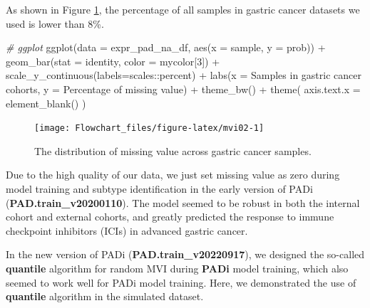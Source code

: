 \documentclass[
  12pt,
]{book}
\newenvironment{Shaded}{\begin{snugshade}}{\end{snugshade}}
\newcommand{\AttributeTok}[1]{\textcolor[rgb]{0.77,0.63,0.00}{#1}}
\newcommand{\CommentTok}[1]{\textcolor[rgb]{0.56,0.35,0.01}{\textit{#1}}}
\newcommand{\DecValTok}[1]{\textcolor[rgb]{0.00,0.00,0.81}{#1}}
\newcommand{\FunctionTok}[1]{\textcolor[rgb]{0.00,0.00,0.00}{#1}}
\newcommand{\NormalTok}[1]{#1}
\newcommand{\SpecialCharTok}[1]{\textcolor[rgb]{0.00,0.00,0.00}{#1}}
\newcommand{\StringTok}[1]{\textcolor[rgb]{0.31,0.60,0.02}{#1}}
\begin{document}
As shown in Figure \ref{fig:mvi02}, the percentage of all samples in gastric cancer datasets we used is lower than 8\%.

\begin{Shaded}
\begin{Highlighting}[]
\CommentTok{\# ggplot}
\FunctionTok{ggplot}\NormalTok{(}\AttributeTok{data =}\NormalTok{ expr\_pad\_na\_df, }
       \FunctionTok{aes}\NormalTok{(}\AttributeTok{x =}\NormalTok{ sample, }\AttributeTok{y =}\NormalTok{ prob)) }\SpecialCharTok{+} 
  \FunctionTok{geom\_bar}\NormalTok{(}\AttributeTok{stat =} \StringTok{\textquotesingle{}identity\textquotesingle{}}\NormalTok{, }\AttributeTok{color =}\NormalTok{ mycolor[}\DecValTok{3}\NormalTok{]) }\SpecialCharTok{+} 
  \FunctionTok{scale\_y\_continuous}\NormalTok{(}\AttributeTok{labels=}\NormalTok{scales}\SpecialCharTok{::}\NormalTok{percent) }\SpecialCharTok{+} 
  \FunctionTok{labs}\NormalTok{(}\AttributeTok{x =} \StringTok{\textquotesingle{}Samples in gastric cancer cohorts\textquotesingle{}}\NormalTok{, }
       \AttributeTok{y =} \StringTok{\textquotesingle{}Percentage of missing value\textquotesingle{}}\NormalTok{) }\SpecialCharTok{+} 
  \FunctionTok{theme\_bw}\NormalTok{() }\SpecialCharTok{+} 
  \FunctionTok{theme}\NormalTok{(}
    \AttributeTok{axis.text.x =} \FunctionTok{element\_blank}\NormalTok{()}
\NormalTok{  )}
\end{Highlighting}
\end{Shaded}

\begin{figure}

{\centering \texttt{[image: Flowchart\_files/figure-latex/mvi02-1]} 

}

\caption{The distribution of missing value across gastric cancer samples.}\label{fig:mvi02}
\end{figure}

Due to the high quality of our data, we just set missing value as zero during model training and subtype identification in the early version of PADi (\textbf{PAD.train\_v20200110}). The model seemed to be robust in both the internal cohort and external cohorts, and greatly predicted the response to immune checkpoint inhibitors (ICIs) in advanced gastric cancer.

In the new version of PADi (\textbf{PAD.train\_v20220917}), we designed the so-called \textbf{quantile} algorithm for random MVI during \textbf{PADi} model training, which also seemed to work well for PADi model training. Here, we demonstrated the use of \textbf{quantile} algorithm in the simulated dataset.
\end{document}
